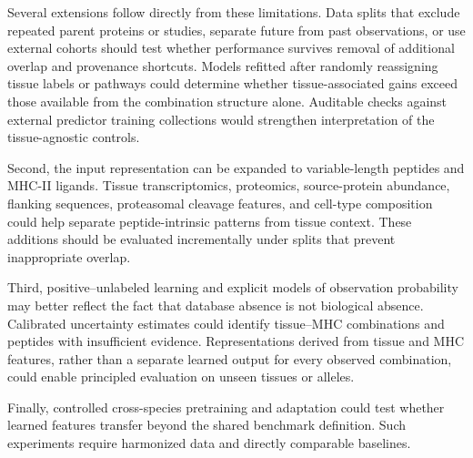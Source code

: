 Several extensions follow directly from these limitations. Data splits that exclude repeated parent proteins or studies, separate future from past observations, or use external cohorts should test whether performance survives removal of additional overlap and provenance shortcuts. Models refitted after randomly reassigning tissue labels or pathways could determine whether tissue-associated gains exceed those available from the combination structure alone. Auditable checks against external predictor training collections would strengthen interpretation of the tissue-agnostic controls.

Second, the input representation can be expanded to variable-length peptides and MHC-II ligands. Tissue transcriptomics, proteomics, source-protein abundance, flanking sequences, proteasomal cleavage features, and cell-type composition could help separate peptide-intrinsic patterns from tissue context. These additions should be evaluated incrementally under splits that prevent inappropriate overlap.

Third, positive--unlabeled learning and explicit models of observation probability may better reflect the fact that database absence is not biological absence. Calibrated uncertainty estimates could identify tissue--MHC combinations and peptides with insufficient evidence. Representations derived from tissue and MHC features, rather than a separate learned output for every observed combination, could enable principled evaluation on unseen tissues or alleles.

Finally, controlled cross-species pretraining and adaptation could test whether learned features transfer beyond the shared benchmark definition. Such experiments require harmonized data and directly comparable baselines.
